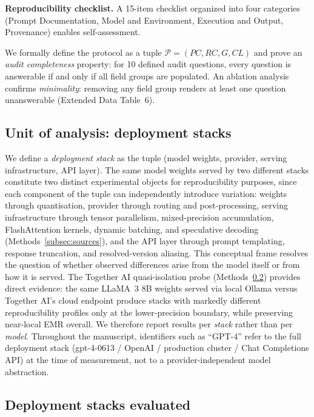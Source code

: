 \documentclass[sn-nature]{sn-jnl}
\begin{document}
\textbf{Reproducibility checklist.}
A 15-item checklist organized into four categories (Prompt Documentation, Model and Environment, Execution and Output, Provenance) enables self-assessment.

We formally define the protocol as a tuple $\mathcal{P} = (\mathit{PC}, \mathit{RC}, G, \mathit{CL})$ and prove an \emph{audit completeness} property: for 10 defined audit questions, every question is answerable if and only if all field groups are populated.
An ablation analysis confirms \emph{minimality}: removing any field group renders at least one question unanswerable (Extended Data Table~6).


\subsection{Unit of analysis: deployment stacks}\label{subsec:stacks}

We define a \emph{deployment stack} as the tuple (model weights, provider, serving infrastructure, API layer).
The same model weights served by two different stacks constitute two distinct experimental objects for reproducibility purposes, since each component of the tuple can independently introduce variation: weights through quantisation, provider through routing and post-processing, serving infrastructure through tensor parallelism, mixed-precision accumulation, FlashAttention kernels, dynamic batching, and speculative decoding (Methods~\ref{subsec:sources}), and the API layer through prompt templating, response truncation, and resolved-version aliasing.
This conceptual frame resolves the question of whether observed differences arise from the model itself or from how it is served.
The Together AI quasi-isolation probe (Methods~\ref{subsec:models}) provides direct evidence: the same LLaMA~3 8B weights served via local Ollama versus Together AI's cloud endpoint produce stacks with markedly different reproducibility profiles only at the lower-precision boundary, while preserving near-local EMR overall.
We therefore report results per \emph{stack} rather than per \emph{model}.
Throughout the manuscript, identifiers such as ``GPT-4'' refer to the full deployment stack (gpt-4-0613 / OpenAI / production cluster / Chat Completions API) at the time of measurement, not to a provider-independent model abstraction.


\subsection{Deployment stacks evaluated}\label{subsec:models}
\end{document}
